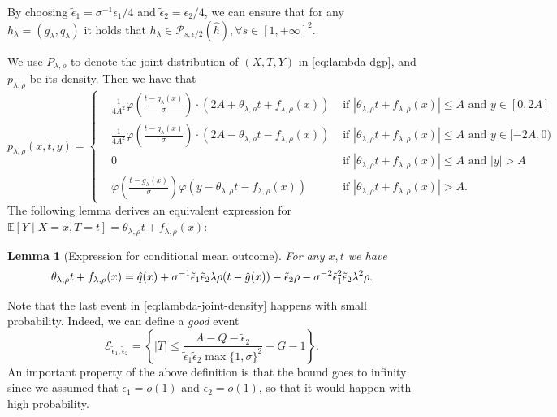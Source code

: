 \documentclass{article}
\def\eps{{\epsilon}}
\def\gE{{\mathcal{E}}}
\def\gP{{\mathcal{P}}}
\newcommand{\E}{\mathbb{E}}
\newtheorem{lemma}{Lemma}[section]
\begin{document}
By choosing $\tilde{\eps}_1=\sigma^{-1}\eps_1/4$ and $\tilde{\eps}_2=\eps_2/4$, we can ensure that for any $h_{\lambda}=(g_{\lambda},q_{\lambda})$ it holds that $h_{\lambda}\in\gP_{s,\eps/2}(\hat{h}), \forall s\in[1,+\infty]^2$.


We use $P_{\lambda,\rho}$ to denote the joint distribution of $(X,T,Y)$ in \eqref{eq:lambda-dgp}, and $p_{\lambda,\rho}$ be its density. Then we have that 
\begin{equation}
    \label{eq:lambda-joint-density}
    p_{\lambda,\rho}(x,t,y) = \left\{ 
    \begin{aligned}
        & \frac{1}{4A^2}\varphi\left(\frac{t-g_{\lambda}(x)}{\sigma}\right)\cdot \left( 2A+\theta_{\lambda,\rho}t+f_{\lambda,\rho}(x)\right) &\text{ if } \left|\theta_{\lambda,\rho}t+f_{\lambda,\rho}(x)\right| \leq A \text{ and } y\in[0,2A] \\
        & \frac{1}{4A^2}\varphi\left(\frac{t-g_{\lambda}(x)}{\sigma}\right)\cdot \left( 2A-\theta_{\lambda,\rho}t-f_{\lambda,\rho}(x)\right) &\text{ if } \left|\theta_{\lambda,\rho}t+f_{\lambda,\rho}(x)\right| \leq A \text{ and } y \in[-2A,0) \\
        & 0 &\text{ if } \left|\theta_{\lambda,\rho}t+f_{\lambda,\rho}(x)\right| \leq A \text{ and } |y| > A \\
        & \varphi\left(\frac{t-g_{\lambda}(x)}{\sigma}\right)\varphi\left(y-\theta_{\lambda,\rho}t-f_{\lambda,\rho}(x)\right) &\text{ if } \left|\theta_{\lambda,\rho}t+f_{\lambda,\rho}(x)\right|>A.
    \end{aligned}
    \right.
\end{equation}
The following lemma derives an equivalent expression for $\E[Y\mid X=x, T=t] = \theta_{\lambda,\rho}t+f_{\lambda,\rho}(x)$:
\begin{lemma}[Expression for conditional mean outcome]
    \label{lemma:equiv-expression-outcome-mean}
    For any $x,t$ we have 
    \begin{equation}
        \notag
        \theta_{\lambda,\rho}t+f_{\lambda,\rho}(x)=\hat{q}(x)+\sigma^{-1}\tilde{\eps}_1\tilde{\eps}_2\lambda\rho(t-\hat{g}(x))-\tilde{\eps}_2\rho-\sigma^{-2}\tilde{\eps}_1^2\tilde{\eps}_2\lambda^2\rho.
    \end{equation}
\end{lemma}
Note that the last event in \eqref{eq:lambda-joint-density} happens with small probability. Indeed, we can define a \emph{good} event
\begin{equation}
    \label{eq:def-good-event}
    \gE_{\tilde{\eps}_1,\tilde{\eps}_2} = \left\{ |T| \leq \frac{A-Q-\tilde{\eps}_2}{\tilde{\eps}_1\tilde{\eps}_2\max\{1,\sigma\}^2} - G -1\right\}.
\end{equation}
An important property of the above definition is that the bound goes to infinity since we assumed that $\eps_1=o(1)$ and $\eps_2=o(1)$, so that it would happen with high probability.
\end{document}
